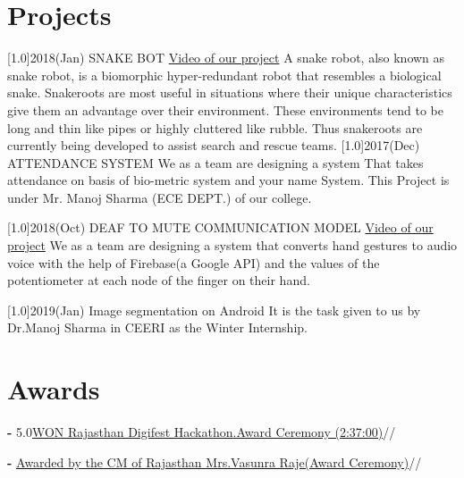 \documentclass[espanol]{cv-style}     %
\begin{document}
\section{Projects}
  \vspace{-0.2cm}
\begin{entrylist}
\entry
{\scalebox{.8}[1.0]{2018(Jan)}}
{SNAKE BOT}
{\href{https://www.youtube.com/watch?v=288WwUiQuMc&t=5s}{Video of our project}}
{A snake robot, also known as snake robot, is a biomorphic
hyper-redundant robot that resembles a biological snake.
Snakeroots are most useful in situations where their unique characteristics give them
an advantage over their environment. These environments tend to be long and thin
like pipes or highly cluttered like rubble. Thus snakeroots are currently being
developed to assist search and rescue teams.}
\entry
{\scalebox{.8}[1.0]{2017(Dec)}}
{ATTENDANCE SYSTEM}
{           }
{We as a team are designing a system That
takes attendance on basis of bio-metric system and your name System. This
Project is under Mr. Manoj Sharma (ECE DEPT.) of
our college.}

\entry
{\scalebox{.8}[1.0]{2018(Oct)}}
{DEAF TO MUTE COMMUNICATION MODEL}
{\href{https://drive.google.com/open?id=1_bYviurdXB6xN-S8j15YnuRMcF-p-heS}{Video of our project}}
{We as a team are designing a system that
converts hand gestures to audio voice with the help of Firebase(a Google API) and the values of the potentiometer at each node of the finger on their hand.}

\entry
{\scalebox{.8}[1.0]{2019(Jan)}}
{Image segmentation on Android}
{It is the task given to us by Dr.Manoj Sharma in CEERI as the Winter Internship.}

\end{entrylist}
  \vspace{-0.2cm}
\section{Awards}
  \vspace{-0.2cm}
\textbf{-}  5.0{\href{https://www.youtube.com/watch?v=rrQgRlSMAI8&t=9536s}{WON Rajasthan Digifest Hackathon.Award Ceremony (2:37:00)}}//

\textbf{-}  {\href{https://twitter.com/DIPRRajasthan/status/1022771192904601601/photo/1}{Awarded by the CM of Rajasthan Mrs.Vasunra Raje(Award Ceremony)}}//
\end{document}
